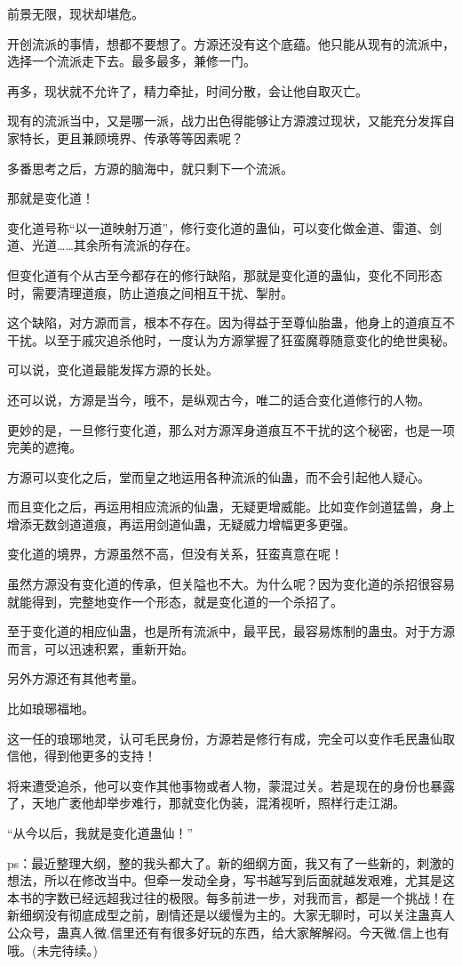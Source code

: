 \begin{this_body}
前景无限，现状却堪危。

开创流派的事情，想都不要想了。方源还没有这个底蕴。他只能从现有的流派中，选择一个流派走下去。最多最多，兼修一门。

再多，现状就不允许了，精力牵扯，时间分散，会让他自取灭亡。

现有的流派当中，又是哪一派，战力出色得能够让方源渡过现状，又能充分发挥自家特长，更且兼顾境界、传承等等因素呢？

多番思考之后，方源的脑海中，就只剩下一个流派。

那就是变化道！

变化道号称“以一道映射万道”，修行变化道的蛊仙，可以变化做金道、雷道、剑道、光道……其余所有流派的存在。

但变化道有个从古至今都存在的修行缺陷，那就是变化道的蛊仙，变化不同形态时，需要清理道痕，防止道痕之间相互干扰、掣肘。

这个缺陷，对方源而言，根本不存在。因为得益于至尊仙胎蛊，他身上的道痕互不干扰。以至于戚灾追杀他时，一度认为方源掌握了狂蛮魔尊随意变化的绝世奥秘。

可以说，变化道最能发挥方源的长处。

还可以说，方源是当今，哦不，是纵观古今，唯二的适合变化道修行的人物。

更妙的是，一旦修行变化道，那么对方源浑身道痕互不干扰的这个秘密，也是一项完美的遮掩。

方源可以变化之后，堂而皇之地运用各种流派的仙蛊，而不会引起他人疑心。

而且变化之后，再运用相应流派的仙蛊，无疑更增威能。比如变作剑道猛兽，身上增添无数剑道道痕，再运用剑道仙蛊，无疑威力增幅更多更强。

变化道的境界，方源虽然不高，但没有关系，狂蛮真意在呢！

虽然方源没有变化道的传承，但关隘也不大。为什么呢？因为变化道的杀招很容易就能得到，完整地变作一个形态，就是变化道的一个杀招了。

至于变化道的相应仙蛊，也是所有流派中，最平民，最容易炼制的蛊虫。对于方源而言，可以迅速积累，重新开始。

另外方源还有其他考量。

比如琅琊福地。

这一任的琅琊地灵，认可毛民身份，方源若是修行有成，完全可以变作毛民蛊仙取信他，得到他更多的支持！

将来遭受追杀，他可以变作其他事物或者人物，蒙混过关。若是现在的身份也暴露了，天地广袤他却举步难行，那就变化伪装，混淆视听，照样行走江湖。

“从今以后，我就是变化道蛊仙！”

ps：最近整理大纲，整的我头都大了。新的细纲方面，我又有了一些新的，刺激的想法，所以在修改当中。但牵一发动全身，写书越写到后面就越发艰难，尤其是这本书的字数已经远超我过往的极限。每多前进一步，对我而言，都是一个挑战！在新细纲没有彻底成型之前，剧情还是以缓慢为主的。大家无聊时，可以关注蛊真人公众号，蛊真人微.信里还有有很多好玩的东西，给大家解解闷。今天微.信上也有哦。(未完待续。)

\end{this_body}

